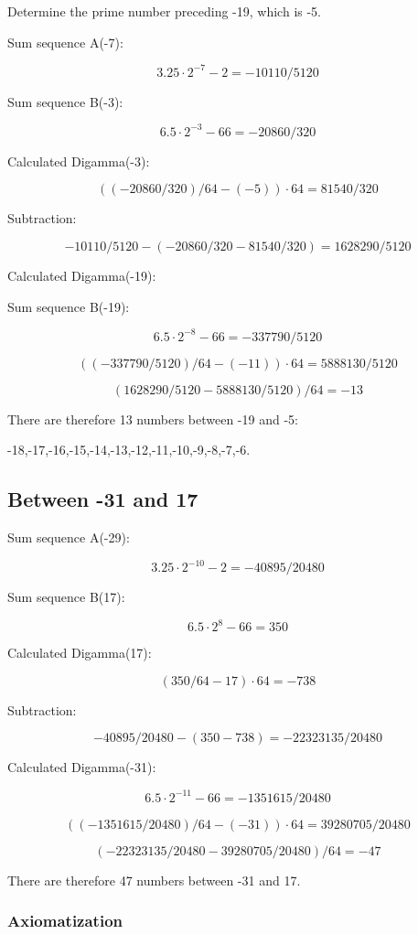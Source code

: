 \documentclass[a4paper,11pt]{article}
\begin{document}
Determine the prime number preceding -19, which is -5.

Sum sequence A(-7):

\[
3.25 \cdot 2^{-7} - 2 = -10110/5120
\]

Sum sequence B(-3):

\[
6.5 \cdot 2^{-3} - 66 = -20860/320
\]

Calculated Digamma(-3):

\[
((-20860/320)/64 - (-5)) \cdot 64 = 81540/320
\]

Subtraction:

\[
-10110/5120 - (-20860/320 - 81540/320) = 1628290/5120
\]

Calculated Digamma(-19):

Sum sequence B(-19):

\[
6.5 \cdot 2^{-8} - 66 = -337790/5120
\]

\[
((-337790/5120)/64 - (-11)) \cdot 64 = 5888130/5120
\]

\[
(1628290/5120 - 5888130/5120)/64 = -13
\]

There are therefore 13 numbers between -19 and -5:

-18,-17,-16,-15,-14,-13,-12,-11,-10,-9,-8,-7,-6.

\subsection*{Between -31 and 17}

Sum sequence A(-29):

\[
3.25 \cdot 2^{-10} - 2 = -40895/20480
\]

Sum sequence B(17):

\[
6.5 \cdot 2^{8} - 66 = 350
\]

Calculated Digamma(17):

\[
(350/64 - 17) \cdot 64 = -738
\]

Subtraction:

\[
-40895/20480 - (350 - 738) = -22323135/20480
\]

Calculated Digamma(-31):

\[
6.5 \cdot 2^{-11} - 66 = -1351615/20480
\]

\[
((-1351615/20480)/64 - (-31)) \cdot 64 = 39280705/20480
\]

\[
(-22323135/20480 - 39280705/20480)/64 = -47
\]

There are therefore 47 numbers between -31 and 17.


\subsubsection{Axiomatization}
\end{document}
